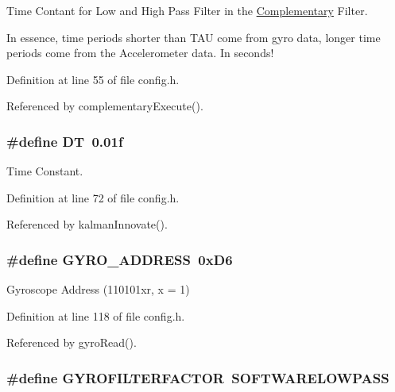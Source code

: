Time Contant for Low and High Pass Filter in the \hyperlink{struct_complementary}{Complementary} Filter. 

In essence, time periods shorter than T\-A\-U come from gyro data, longer time periods come from the Accelerometer data. In seconds! 

Definition at line 55 of file config.\-h.



Referenced by complementary\-Execute().

\hypertarget{group__config_ga943f07034774ef1261d62cd0d3d1fec9}{
\subsubsection[{D\-T}]{\setlength{\rightskip}{0pt plus 5cm}\#define D\-T~0.\-01f}}\label{group__config_ga943f07034774ef1261d62cd0d3d1fec9}


Time Constant. 



Definition at line 72 of file config.\-h.



Referenced by kalman\-Innovate().

\hypertarget{group__config_ga8ed1f343e82440b4ef900e5fe42d74f0}{
\subsubsection[{G\-Y\-R\-O\-\_\-\-A\-D\-D\-R\-E\-S\-S}]{\setlength{\rightskip}{0pt plus 5cm}\#define G\-Y\-R\-O\-\_\-\-A\-D\-D\-R\-E\-S\-S~0x\-D6}}\label{group__config_ga8ed1f343e82440b4ef900e5fe42d74f0}


Gyroscope Address (110101xr, x = 1) 



Definition at line 118 of file config.\-h.



Referenced by gyro\-Read().

\hypertarget{group__config_ga1b5d47810976ecbfd688513246db3ba9}{
\subsubsection[{G\-Y\-R\-O\-F\-I\-L\-T\-E\-R\-F\-A\-C\-T\-O\-R}]{\setlength{\rightskip}{0pt plus 5cm}\#define G\-Y\-R\-O\-F\-I\-L\-T\-E\-R\-F\-A\-C\-T\-O\-R~{\bf S\-O\-F\-T\-W\-A\-R\-E\-L\-O\-W\-P\-A\-S\-S}}}\label{group__config_ga1b5d47810976ecbfd688513246db3ba9}


